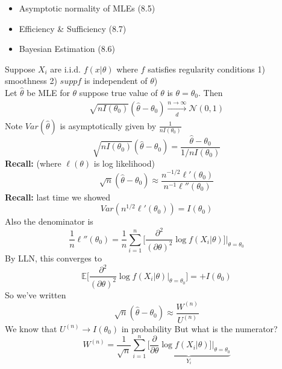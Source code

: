 \begin{itemize}
	\item Asymptotic normality of MLEs (8.5)
	\item Efficiency \& Sufficiency (8.7)
	\item Bayesian Estimation (8.6)
\end{itemize}
Suppose $X_i$ are i.i.d. $f(x | \theta)$ where $f$ satisfies regularity conditions 1) smoothness 2) $supp f$ is independent of $\theta$)\\
Let $\hat{\theta}$ be MLE for $\theta$ suppose true value of $\theta$ is $\theta = \theta_0$. Then
\begin{gather*}
	\sqrt{n I(\theta_0)} (\hat{\theta} - \theta_0) \xrightarrow[d]{n \rightarrow \infty} \mathcal{N} (0,1)
\end{gather*}
Note $Var(\hat{\theta})$ is asymptotically given by $\frac{1}{nI(\theta_0)}$
\begin{equation*}
	\sqrt{nI(\theta_0)} (\hat{\theta} - \theta_0) = \frac{\hat{\theta} - \theta_0}{1/nI(\theta_0)}
\end{equation*}
\textbf{Recall:} (where $\ell(\theta)$ is log likelihood)
\begin{equation*}
	\sqrt{n}(\hat{\theta} - \theta_0) \approx \frac{n^{-1/2}\ell ' (\theta_0)}{n^{-1} \ell '' (\theta_0)}
\end{equation*}
\textbf{Recall:} last time we showed
\begin{equation*}
	Var(n^{1/2} \ell ' (\theta_0)) = I(\theta_0)
\end{equation*}
Also the denominator is
\begin{equation*}
	\frac{1}{n} \ell '' (\theta_0) = \frac{1}{n} \sum_{i=1}^n \bigg[ \frac{\partial^2}{(\partial \theta)^2} \log f(X_i | \theta) \bigg] \bigg|_{\theta = \theta_0}
\end{equation*}
By LLN, this converges to
\begin{equation*}
	\mathbb{E} \bigg[ \frac{\partial^2}{(\partial \theta)^2} \log f(X_i | \theta)  \bigg|_{\theta = \theta_0} \bigg] = + I(\theta_0)
\end{equation*}
So we've written
\begin{equation*}
	\sqrt{n} (\hat{\theta} - \theta_0) \approx \frac{W^{(n)}}{U^{(n)}}
\end{equation*}
We know that $U^{(n)} \rightarrow I(\theta_0)$ in probability But what is the numerator?
\begin{equation*}
	W^{(n)} = \frac{1}{\sqrt{n}} \sum_{i=1}^n \underbrace{\bigg[ \frac{\partial}{\partial \theta} \log f(X_i | \theta)\bigg] \bigg|_{\theta = \theta_0}}_{Y_i}
\end{equation*}
